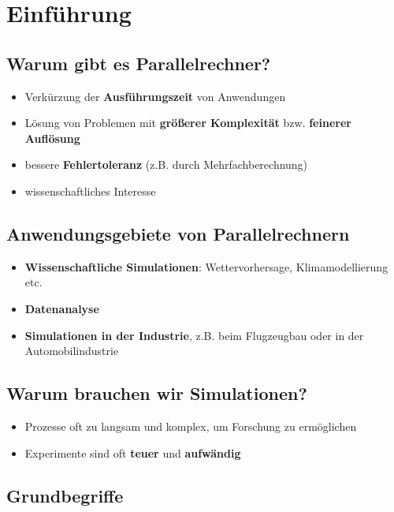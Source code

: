 \documentclass[12pt,A4]{extarticle}
\begin{document}
\disclaimer

\tableofcontents
\clearpage

\section{Einführung}
\subsection{Warum gibt es Parallelrechner?}
\begin{itemize}
    \item{Verkürzung der \textbf{Ausführungszeit} von Anwendungen}
    \item{Lösung von Problemen mit \textbf{größerer Komplexität} bzw. \textbf{feinerer Auflösung}}
    \item{bessere \textbf{Fehlertoleranz} (z.B. durch Mehrfachberechnung)}
    \item{wissenschaftliches Interesse}
\end{itemize}

\subsection{Anwendungsgebiete von Parallelrechnern}
\begin{itemize}
    \item{\textbf{Wissenschaftliche Simulationen}: Wettervorhersage, Klimamodellierung etc.}
    \item{\textbf{Datenanalyse}}
    \item{\textbf{Simulationen in der Industrie}, z.B. beim Flugzeugbau oder in der Automobilindustrie}
\end{itemize}

\subsection{Warum brauchen wir Simulationen?}
\begin{itemize}
    \item{Prozesse oft zu langsam und komplex, um Forschung zu ermöglichen}
    \item{Experimente sind oft \textbf{teuer} und \textbf{aufwändig}}
\end{itemize}

\subsection{Grundbegriffe}
\end{document}
